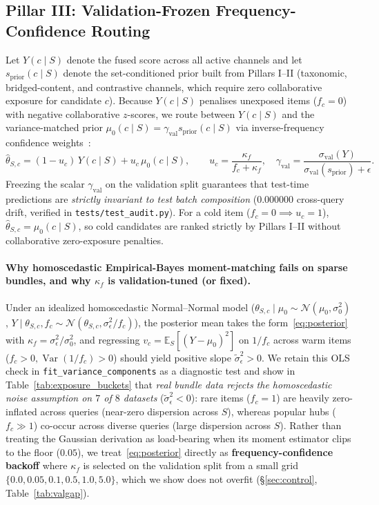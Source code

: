 \subsection{Pillar III: Validation-Frozen Frequency-Confidence Routing}
\label{sec:eb}
\label{sec:fusion}
\label{sec:complexity}
Let $Y(c\mid S)$ denote the fused score across all active channels and let $s_{\text{prior}}(c\mid S)$ denote the
set-conditioned prior built from Pillars I--II (taxonomic, bridged-content, and contrastive channels, which require
zero collaborative exposure for candidate $c$). Because $Y(c\mid S)$ penalises unexposed items ($f_c=0$) with
negative collaborative $z$-scores, we route between $Y(c\mid S)$ and the variance-matched prior
$\mu_0(c\mid S) = \gamma_{\text{val}} s_{\text{prior}}(c\mid S)$ via inverse-frequency confidence
weights~\cite{bell2007,agarwal2009}:
\begin{equation}
  \hat{\theta}_{S,c}
  = (1 - u_c)\,Y(c\mid S) + u_c\,\mu_0(c\mid S),
  \qquad u_c = \frac{\kappa_f}{f_c + \kappa_f}, \quad
  \gamma_{\text{val}} = \frac{\sigma_{\text{val}}(Y)}{\sigma_{\text{val}}(s_{\text{prior}}) + \epsilon}.
  \label{eq:posterior}
\end{equation}
Freezing the scalar $\gamma_{\text{val}}$ on the validation split guarantees that test-time predictions are
\emph{strictly invariant to test batch composition} ($0.000000$ cross-query drift, verified in
\texttt{tests/test\_audit.py}). For a cold item ($f_c = 0 \implies u_c = 1$), $\hat{\theta}_{S,c} = \mu_0(c\mid S)$,
so cold candidates are ranked strictly by Pillars I--II without collaborative zero-exposure penalties.

\paragraph{Why homoscedastic Empirical-Bayes moment-matching fails on sparse bundles, and why $\kappa_f$ is validation-tuned (or fixed).}
Under an idealized homoscedastic Normal--Normal model ($\theta_{S,c}\mid\mu_0 \sim \mathcal{N}(\mu_0,\sigma_0^2)$,
$Y\mid\theta_{S,c},f_c \sim \mathcal{N}(\theta_{S,c}, \sigma_\epsilon^2/f_c)$), the posterior mean takes the
form~\eqref{eq:posterior} with $\kappa_f = \sigma_\epsilon^2/\sigma_0^2$, and regressing $v_c = \mathbb{E}_S[(Y -
\mu_0)^2]$ on $1/f_c$ across warm items ($f_c > 0, \operatorname{Var}(1/f_c)>0$) should yield positive slope
$\tilde{\sigma}_\epsilon^2 > 0$. We retain this OLS check in \texttt{fit\_variance\_components} as a diagnostic test
and show in Table~\ref{tab:exposure_buckets} that \emph{real bundle data rejects the homoscedastic noise assumption on
$7$ of $8$ datasets} ($\tilde{\sigma}_\epsilon^2 < 0$): rare items ($f_c=1$) are heavily zero-inflated across queries
(near-zero dispersion across $S$), whereas popular hubs ($f_c \gg 1$) co-occur across diverse queries (large
dispersion across $S$). Rather than treating the Gaussian derivation as load-bearing when its moment estimator clips
to the floor ($0.05$), we treat~\eqref{eq:posterior} directly as \textbf{frequency-confidence backoff} where $\kappa_f$
is selected on the validation split from a small grid $\{0.0, 0.05, 0.1, 0.5, 1.0, 5.0\}$, which we show does not
overfit (\S\ref{sec:control}, Table~\ref{tab:valgap}).
